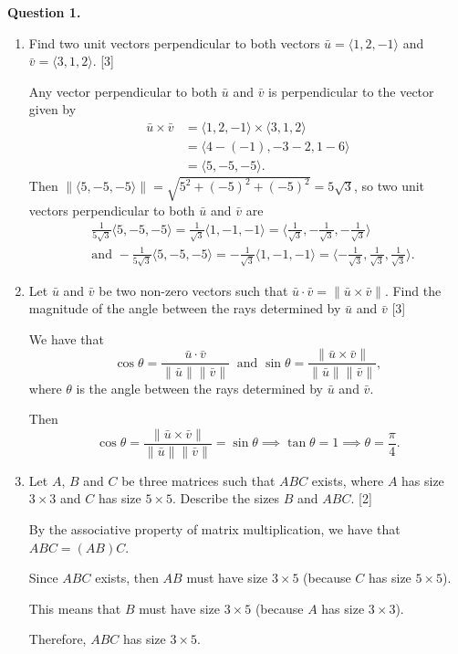 \documentclass[11pt]{article}
\begin{document}
\textbf{Question 1.}
\begin{enumerate}[label=\alph*)]
    \item Find two unit vectors perpendicular to both vectors \(\bar{u} =\langle1,2,-1\rangle\) and \(\bar{v}=\langle3,1,2\rangle\). \hfill [3]
    
    \color{blue}
    Any vector perpendicular to both \(\bar{u}\) and \(\bar{v}\) is perpendicular to the vector given by
    \[
        \begin{aligned}
            \bar{u} \times \bar{v} &= \langle1,2,-1\rangle\times\langle3,1,2\rangle\\
            &=\langle4-(-1),-3-2,1-6\rangle\\
            &=\langle5,-5,-5\rangle.
        \end{aligned}
    \]
    Then \(\|\langle5,-5,-5\rangle\| = \sqrt{5^2+(-5)^2+(-5)^2} = 5\sqrt{3}\), so two unit vectors perpendicular to both \(\bar{u}\) and \(\bar{v}\) are
    \[
    \begin{aligned}
      &\frac{1}{5\sqrt{3}}\langle5,-5,-5\rangle = \frac{1}{\sqrt{3}}\langle1,-1,-1\rangle = \langle\frac{1}{\sqrt{3}},-\frac{1}{\sqrt{3}},-\frac{1}{\sqrt{3}}\rangle\\
        &\text{and } -\frac{1}{5\sqrt{3}}\langle5,-5,-5\rangle = -\frac{1}{\sqrt{3}}\langle1,-1,-1\rangle = \langle-\frac{1}{\sqrt{3}},\frac{1}{\sqrt{3}},\frac{1}{\sqrt{3}}\rangle.  
    \end{aligned}
        \]
    \color{black}

    \item Let \(\bar{u}\) and \(\bar{v}\) be two non-zero vectors such that \(\bar{u} \cdot  \bar{v} = \|\bar{u} \times \bar{v}\|\).
    Find the magnitude of the angle between the rays determined by \(\bar{u}\) and \(\bar{v}\) \hfill [3]

    \color{blue}
    We have that \[\cos\theta = \frac{\bar{u} \cdot \bar{v}}{\|\bar{u}\|\|\bar{v}\|}\ \text{ and } \sin\theta = \frac{\|\bar{u} \times \bar{v}\|}{\|\bar{u}\|\|\bar{v}\|},\] where \(\theta\) is the angle between the rays determined by \(\bar{u}\) and \(\bar{v}\).

   Then
   \[
        \cos\theta = \frac{\|\bar{u} \times \bar{v}\|}{\|\bar{u}\|\|\bar{v}\|} = \sin\theta \implies \tan\theta = 1 \implies \theta = \frac{\pi}{4}.
   \]
    \color{black}
    \item Let \(A\), \(B\) and \(C\) be three matrices such that \(ABC\) exists, where \(A\) has size \(3\times3\) and \(C\) has size \(5\times5\).
    Describe the sizes \(B\) and \(ABC\). \hfill [2]

    \color{blue}

    By the associative property of matrix multiplication, we have that \(ABC = (AB)C\).
    
    Since \(ABC\) exists, then \(AB\) must have size \(3\times5\) (because \(C\) has size \(5\times5\)). 
    
    This means that \(B\) must have size \(3\times5\) (because \(A\) has size \(3\times3\)).

    Therefore, \(ABC\) has size \(3\times5\).
    \color{black}
\end{enumerate}
\end{document}
